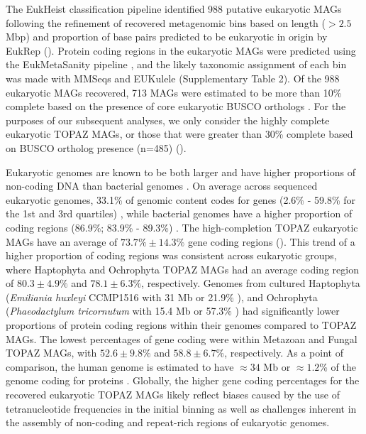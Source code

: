 \documentclass[12pt]{article}
\numberwithin{equation}{section}
\begin{document}
The EukHeist classification pipeline identified 988 putative eukaryotic MAGs following the refinement of recovered metagenomic bins based on length ($>2.5$ Mbp) and proportion of base pairs predicted to be eukaryotic in origin by EukRep \citep{West2018Genome-reconstruction} (). Protein coding regions in the eukaryotic MAGs were predicted using the EukMetaSanity pipeline \citep{EukMS}, and the likely taxonomic assignment of each bin was made with MMSeqs \citep{Steinegger2018} and EUKulele \citep{Krinos2021EUKulele} (Supplementary Table 2). Of the 988 eukaryotic MAGs recovered, 713 MAGs were estimated to be more than 10\% complete based on the presence of core eukaryotic BUSCO orthologs \citep{Simao2015BUSCO}. For the purposes of our subsequent analyses, we only consider the highly complete eukaryotic TOPAZ MAGs, or those that were greater than 30\% complete based on BUSCO ortholog presence (n=485) (). 

Eukaryotic genomes are known to be both larger and have higher proportions of non-coding DNA than bacterial genomes \citep{Zhang2011practical}. On average across sequenced eukaryotic genomes, 33.1\% of genomic content codes for genes (2.6\% - 59.8\% for the 1st and 3rd quartiles) \citep{Hou_2009}, while bacterial genomes have a higher proportion of coding regions (86.9\%; 83.9\% - 89.3\%) \citep{Hou_2009}. The high-completion TOPAZ eukaryotic MAGs have an average of $73.7\% \pm 14.3\%$ gene coding regions (). This trend of a higher proportion of coding regions was consistent across eukaryotic groups, where Haptophyta and Ochrophyta TOPAZ MAGs had an average coding region of $80.3 \pm 4.9\%$ and $78.1 \pm 6.3\%$, respectively. Genomes from cultured Haptophyta (\textit{Emiliania huxleyi} CCMP1516 with 31 Mb or 21.9\% \citep{Read2013}), and Ochrophyta (\textit{Phaeodactylum tricornutum} with 15.4 Mb or 57.3\% \citep{Bowler_2008}) had significantly lower proportions of protein coding regions within their genomes compared to TOPAZ MAGs. The lowest percentages of gene coding were within Metazoan and Fungal TOPAZ MAGs, with $52.6\pm 9.8\%$ and  $58.8 \pm 6.7\%$, respectively. As a point of comparison, the human genome is estimated to have $\approx 34$ Mb or $\approx 1.2$\% of the  genome coding for proteins \citep{humangenome}. Globally, the higher gene coding percentages for the recovered eukaryotic TOPAZ MAGs likely reflect biases caused by the use of tetranucleotide frequencies in the initial binning \citep{Kang_2019} as well as challenges inherent in the assembly of non-coding and repeat-rich regions of eukaryotic genomes. 
\end{document}
